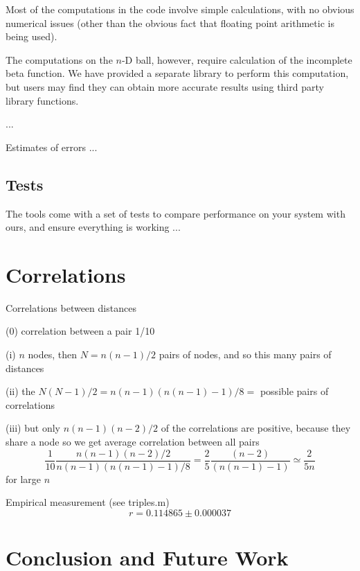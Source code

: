 \documentclass{article}
\begin{document}
Most of the computations in the code involve simple calculations, with
no obvious numerical issues (other than the obvious fact that floating
point arithmetic is being used).

The computations on the $n$-D ball, however, require calculation of
the incomplete beta function. We have provided a separate library to
perform this computation, but users may find they can obtain more
accurate results using third party library functions. 

...

Estimates of errors ...


\subsection{Tests}

The tools come with a set of tests to compare performance on your
system with ours, and ensure everything is working ...





\section{Correlations}

Correlations between distances \cite{bartlett64}

(0) correlation between a pair 1/10

(i) $n$ nodes, then $N = n (n-1)/2$ pairs of nodes, and so this many pairs of distances

(ii) the $N (N-1) /2 = n (n-1) (n (n-1) -1)/8 = $ possible pairs of
correlations

(iii) but only $n(n-1)(n-2)/2$ of the correlations are positive,
because they share a node so we get average correlation between all
pairs
 \[ \frac{1}{10} \frac{n(n-1)(n-2)/2}{n (n-1) (n (n-1) -1)/8} =
    \frac{2}{5} \frac{(n-2)}{(n (n-1) -1)}
   \simeq 
   \frac{2}{5n}
\]
for large $n$

Empirical measurement (see triples.m)
\[ r = 0.114865 \pm 0.000037\]


\section{Conclusion and Future Work}




\setlength{\parskip}{1mm}

% 

\end{document}
